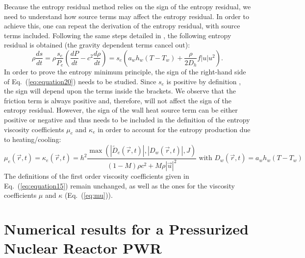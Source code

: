 \documentclass[12pt]{article}
\newcommand{\eqt}[1]{Eq.~(\ref{#1})} %
\begin{document}
Because the entropy residual method relies on the sign of the entropy residual, we need to understand how source terms may affect the entropy residual. In order to achieve this, one can repeat the derivation of the entropy residual,  with source terms included. Following the same steps detailed in \cite{jlg}, the following entropy residual is obtained (the gravity dependent terms cancel out):
\begin{equation}
\label{eq:equation20}
\rho \frac{ds}{dt} = \rho \frac{s_e}{P_e}\left( \frac{dP}{dt} - c^2 \frac{d \rho}{dt} \right) = s_e \left( a_w h_w (T - T_w) + \frac{\rho}{2 D_h} f |u| u^2 \right) .
\end{equation}
In order to prove the entropy minimum principle, the sign of the right-hand side of \eqt{eq:equation20} needs to be studied. Since $s_e$ is positive by definition \cite{jlg}, the sign will depend upon the terms inside the brackets. We observe that the friction term is always positive and, therefore, will not affect the sign of the entropy residual. However, the sign of the wall heat source term can be either positive or negative and thus needs to be included in the definition of the entropy viscosity coefficients $\mu_e$ and $\kappa_e$ in order to account for the entropy production due to heating/cooling:
\begin{equation}
\label{eq:equation21}
\mu_e(\vec{r},t) = \kappa_e(\vec{r},t) = h^2 \frac{\max\left( | \tilde{D}_e(\vec{r},t) |, | D_w(\vec{r},t) |, J \right)}{(1-M) \rho c^2 + M \rho |\vec{u}|^2} \text{ with } D_w(\vec{r},t) = a_w h_w (T - T_w)
\end{equation}
The definitions of the first order viscosity coefficients given in \eqt{eq:equation15} remain unchanged, as well as the ones for the viscosity coefficients $\mu$ and $\kappa$ (\eqt{eq:mu}).

%
\section{Numerical results for a Pressurized Nuclear Reactor PWR}
\label{sec:results}
\end{document}
